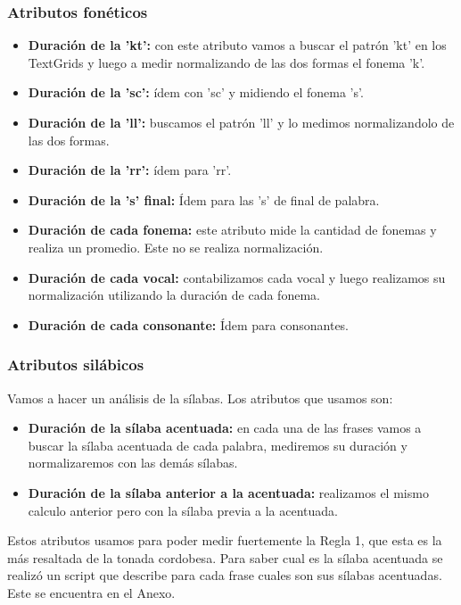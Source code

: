 \documentclass[11pt,a4paper,twoside]{tesis}
\begin{document}
\subsubsection{Atributos fonéticos}

\begin{itemize}
    \item \textbf{Duración de la 'kt':} con este atributo vamos a buscar el patrón 'kt' en los TextGrids y luego a medir normalizando de las dos formas el fonema 'k'.  
    \item \textbf{Duración de la 'sc':} ídem con 'sc' y midiendo el fonema 's'.
    \item \textbf{Duración de la 'll':} buscamos el patrón 'll' y lo medimos normalizandolo de las dos formas.
    \item \textbf{Duración de la 'rr':} ídem para 'rr'.
    \item \textbf{Duración de la 's' final:} Ídem para las 's' de final de palabra.
    
    \item \textbf{Duración de cada fonema:} este atributo mide la cantidad de fonemas y realiza un promedio. Este no se realiza normalización.  
    \item \textbf{Duración de cada vocal:} contabilizamos cada vocal y luego realizamos su normalización utilizando la duración de cada fonema.
    \item \textbf{Duración de cada consonante:} Ídem para consonantes. 
\end{itemize}

\subsubsection{Atributos silábicos}

Vamos a hacer un análisis de la sílabas. Los atributos que usamos son:

\begin{itemize}
    \item \textbf{Duración de la sílaba acentuada:} en cada una de las frases vamos a buscar la sílaba acentuada de cada palabra, mediremos su duración y normalizaremos con las demás sílabas.
    \item \textbf{Duración de la sílaba anterior a la acentuada:} realizamos el mismo calculo anterior pero con la sílaba previa a la acentuada. 
\end{itemize}

Estos atributos usamos para poder medir fuertemente la Regla 1, que esta es la más resaltada de la tonada cordobesa. Para saber cual es la sílaba acentuada se realizó un script que describe para cada frase cuales son sus sílabas acentuadas. Este se encuentra en el Anexo.
\end{document}
